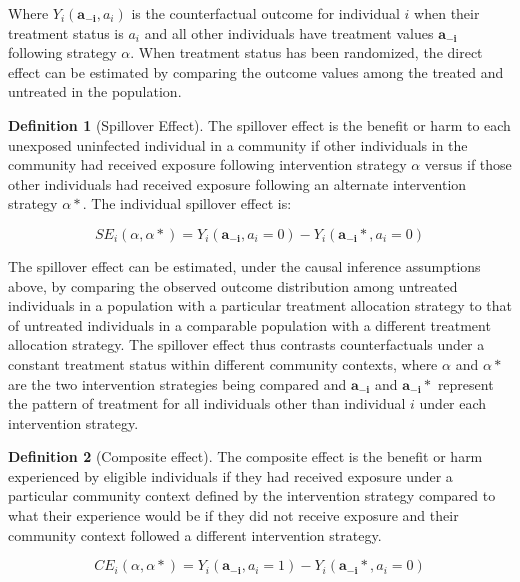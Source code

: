 \documentclass{article}
\theoremstyle{definition}
\newtheorem{definition}{Definition}[section]
\begin{document}
Where $Y_{i}(\mathbf{a_{-i}},a_{i})$ is the counterfactual outcome for individual $i$ when their treatment status is $a_{i}$ and all other individuals have treatment values $\mathbf{a_{-i}}$ following strategy $\alpha$. When treatment status has been randomized, the direct effect can be estimated by comparing the outcome values among the treated and untreated in the population. 

\begin{definition}[Spillover Effect] The spillover effect is the benefit or harm to each unexposed uninfected individual in a community if other individuals in the community had received exposure following intervention strategy $\alpha$ versus if those other individuals had received exposure following an alternate intervention strategy $\alpha*$. The individual spillover effect is:
\end{definition}

\begin{equation}\label{eq:2}
   SE_{i}\left(\alpha,\alpha*\right) = Y_{i}\left(\mathbf{a_{-i}}, a_{i} = 0\right) - Y_{i}\left(\mathbf{a_{-i}*}, a_{i} = 0\right)	
\end{equation}

The spillover effect can be estimated, under the causal inference assumptions above, by comparing the observed outcome distribution among untreated individuals in a population with a particular treatment allocation strategy to that of untreated individuals in a comparable population with a different treatment allocation strategy. The spillover effect thus contrasts counterfactuals under a constant treatment status within different community contexts, where $\alpha$ and $\alpha*$ are the two intervention strategies being compared and $\mathbf{a_{-i}}$ and $\mathbf{a_{-i}}*$ represent the pattern of treatment for all individuals other than individual $i$ under each intervention strategy.

	
\begin{definition}[Composite effect]The composite effect is the benefit or harm experienced by eligible individuals if they had received exposure under a particular community context defined by the intervention strategy compared to what their experience would be if they did not receive exposure and their community context followed a different intervention strategy.
\end{definition}

\begin{equation}\label{eq:3}
   CE_{i}\left(\alpha,\alpha*\right) = Y_{i}\left(\mathbf{a_{-i}}, a_{i} = 1\right) - Y_{i}\left(\mathbf{a_{-i}*}, a_{i} = 0\right)	
\end{equation}
\end{document}
